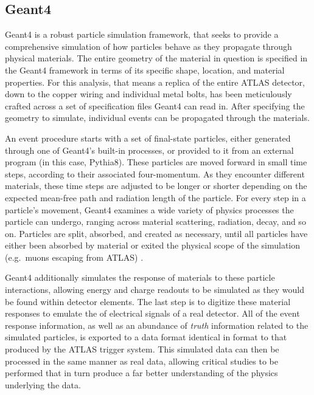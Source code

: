     \subsection{Geant4}

    Geant4 is a robust particle simulation framework,
        that seeks to provide a comprehensive simulation of how particles behave as they propagate through physical materials.
    The entire geometry of the material in question is specified in the Geant4 framework in terms of
        its specific shape, location, and material properties.
    For this analysis, that means a replica of the entire ATLAS detector,
        down to the copper wiring and individual metal bolts,
        has been meticulously crafted across a set of specification files Geant4 can read in.
    After specifying the geometry to simulate, individual events can be propagated through the materials.

    An event procedure starts with a set of final-state particles,
        either generated through one of Geant4's built-in processes,
        or provided to it from an external program (in this case, Pythia8).
    These particles are moved forward in small time steps, according to their associated four-momentum.
    As they encounter different materials,
        these time steps are adjusted to be longer or shorter depending on
        the expected mean-free path and radiation length of the particle.
    For every step in a particle's movement,
        Geant4 examines a wide variety of physics processes the particle can undergo,
        ranging across material scattering, radiation, decay, and so on.
    Particles are split, absorbed, and created as necessary,
        until all particles have either been absorbed by material
        or exited the physical scope of the simulation (e.g.\ muons escaping from ATLAS) \cite{geant4}.

    Geant4 additionally simulates the response of materials to these particle interactions,
        allowing energy and charge readouts to be simulated as they would be found within detector elements.
    The last step is to digitize these material responses to emulate the of electrical signals of a real detector.
    All of the event response information, as well as an abundance of \textit{truth} information related to the simulated particles,
        is exported to a data format identical in format to that produced by the ATLAS trigger system.
    This simulated data can then be processed in the same manner as real data,
        allowing critical studies to be performed that in turn produce
        a far better understanding of the physics underlying the data.

